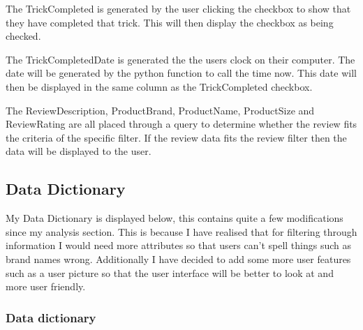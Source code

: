 The TrickCompleted is generated by the user clicking the checkbox to show that they have completed that trick. This will then display the checkbox as being checked.

The TrickCompletedDate is generated the the users clock on their computer. The date will be generated by the python function to call the time now. This date will then be displayed in the same column as the TrickCompleted checkbox.

The ReviewDescription, ProductBrand, ProductName, ProductSize and ReviewRating are all placed through a query to determine whether the review fits the criteria of the specific filter. If the review data fits the review filter then the data will be displayed to the user.

\subsection{Data Dictionary}

My Data Dictionary is displayed below, this contains quite a few modifications since my analysis section. This is because I have realised that for filtering through information I would need more attributes so that users can't spell things such as brand names wrong. Additionally I have decided to add some more user features such as a user picture so that the user interface will be better to look at and more user friendly. 



\subsubsection{Data dictionary}

